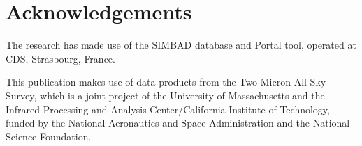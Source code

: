\chapter*{Acknowledgements}

The research has made use of the SIMBAD database and Portal tool, operated at CDS, Strasbourg, France. 

This publication makes use of data products from the Two Micron All Sky Survey, which is a joint project of the University of Massachusetts and the Infrared Processing and Analysis Center/California Institute of Technology, funded by the National Aeronautics and Space Administration and the National Science Foundation.